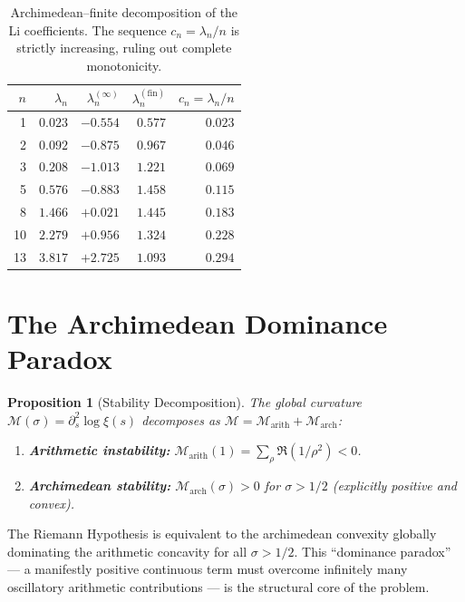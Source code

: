 \documentclass[12pt,a4paper]{article}
\newtheorem{proposition}[theorem]{Proposition}
\theoremstyle{definition}
\theoremstyle{remark}
\begin{document}
\begin{table}[h]
\centering
\renewcommand{\arraystretch}{1.15}
\begin{tabular}{r|r|r|r|r}
$n$ & $\lambda_n$ & $\lambda_n^{(\infty)}$ & $\lambda_n^{(\mathrm{fin})}$ & $c_n = \lambda_n/n$ \\\hline
1 & $0.023$ & $-0.554$ & $0.577$ & $0.023$ \\
2 & $0.092$ & $-0.875$ & $0.967$ & $0.046$ \\
3 & $0.208$ & $-1.013$ & $1.221$ & $0.069$ \\
5 & $0.576$ & $-0.883$ & $1.458$ & $0.115$ \\
8 & $1.466$ & $+0.021$ & $1.445$ & $0.183$ \\
10 & $2.279$ & $+0.956$ & $1.324$ & $0.228$ \\
13 & $3.817$ & $+2.725$ & $1.093$ & $0.294$ \\
\end{tabular}
\caption{Archimedean--finite decomposition of the Li coefficients. The sequence $c_n = \lambda_n/n$ is strictly increasing, ruling out complete monotonicity.}
\label{tab:li-coefficients}
\end{table}


\section{The Archimedean Dominance Paradox}
\label{sec:dominance}

\begin{proposition}[Stability Decomposition]
\label{prop:stability}
The global curvature $\mathcal{M}(\sigma) = \partial_s^2\log\xi(s)$ decomposes as
$\mathcal{M} = \mathcal{M}_{\mathrm{arith}} + \mathcal{M}_{\mathrm{arch}}$:
\begin{enumerate}
  \item \textbf{Arithmetic instability:} $\mathcal{M}_{\mathrm{arith}}(1) = \sum_\rho \Re(1/\rho^2) < 0$.
  \item \textbf{Archimedean stability:} $\mathcal{M}_{\mathrm{arch}}(\sigma) > 0$ for $\sigma > 1/2$ (explicitly positive and convex).
\end{enumerate}
\end{proposition}

\noindent The Riemann Hypothesis is equivalent to the archimedean convexity globally dominating the arithmetic concavity for all $\sigma > 1/2$. This ``dominance paradox'' --- a manifestly positive continuous term must overcome infinitely many oscillatory arithmetic contributions --- is the structural core of the problem.
\end{document}
